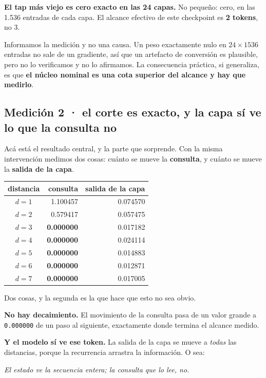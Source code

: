 \documentclass[11pt,a4paper]{article}
\begin{document}
\textbf{El tap más viejo es cero exacto en las 24 capas.} No pequeño: cero, en las 1.536 entradas de
cada capa. El alcance efectivo de este checkpoint es \textbf{2 tokens}, no 3.

Informamos la medición y no una causa. Un peso exactamente nulo en $24 \times 1536$ entradas no sale
de un gradiente, así que un artefacto de conversión es plausible, pero no lo verificamos y no lo
afirmamos. La consecuencia práctica, si generaliza, es que \textbf{el núcleo nominal es una cota
superior del alcance y hay que medirlo}.

\subsection*{Medición 2 · el corte es exacto, y la capa sí ve lo que la consulta no}

Acá está el resultado central, y la parte que sorprende. Con la misma intervención medimos dos cosas:
cuánto se mueve la \textbf{consulta}, y cuánto se mueve la \textbf{salida de la capa}.

\begin{center}
\begin{tabular}{crr}
\toprule
distancia & consulta & salida de la capa \\
\midrule
$d=1$ & 1.100457 & 0.074570 \\
$d=2$ & 0.579417 & 0.057475 \\
$d=3$ & \textbf{0.000000} & 0.017182 \\
$d=4$ & \textbf{0.000000} & 0.024114 \\
$d=5$ & \textbf{0.000000} & 0.014883 \\
$d=6$ & \textbf{0.000000} & 0.012871 \\
$d=7$ & \textbf{0.000000} & 0.017005 \\
\bottomrule
\end{tabular}
\end{center}

Dos cosas, y la segunda es la que hace que esto no sea obvio.

\textbf{No hay decaimiento.} El movimiento de la consulta pasa de un valor grande a \texttt{0.000000}
de un paso al siguiente, exactamente donde termina el alcance medido.

\textbf{Y el modelo sí ve ese token.} La salida de la capa se mueve a \emph{todas} las distancias,
porque la recurrencia arrastra la información. O sea:

\begin{center}
\emph{El estado ve la secuencia entera; la consulta que lo lee, no.}
\end{center}
\end{document}
